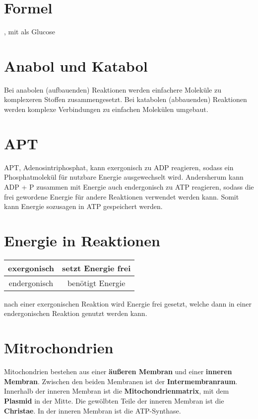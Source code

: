 \documentclass{article}
\begin{document}
 
\section{Formel} 
, mit  als Glucose
  
\section{Anabol und Katabol} 
Bei anabolen (aufbauenden) Reaktionen werden einfachere Moleküle zu komplexeren Stoffen zusammengesetzt. Bei katabolen (abbauenden) Reaktionen werden komplexe Verbindungen zu einfachen Molekülen umgebaut.
 
\section{APT}
APT, Adenosintriphosphat, kann exergonisch zu ADP reagieren, sodass ein Phosphatmolekül für nutzbare Energie ausgewechselt wird. Andersherum kann ADP + P zusammen mit Energie auch endergonisch zu ATP reagieren, sodass die frei gewordene Energie für andere Reaktionen verwendet werden kann. Somit kann Energie sozusagen in ATP gespeichert werden.
 
\section{Energie in Reaktionen}
 
\begin{center}
\begin{tabular}{ |c|c| }
\hline
 exergonisch & setzt Energie frei \\
\hline
 endergonisch & benötigt Energie \\
\hline
\end{tabular}
\end{center}
nach einer exergonischen Reaktion wird Energie frei gesetzt, welche dann in einer endergonischen Reaktion genutzt werden kann.
 
\section{Mitrochondrien} 
Mitochondrien bestehen aus einer \textbf{äußeren Membran} und einer \textbf{inneren Membran}. Zwischen den beiden Membranen ist der \textbf{Intermembranraum}. Innerhalb der inneren Membran ist die \textbf{Mitochondrienmatrix}, mit dem \textbf{Plasmid} in der Mitte. Die gewölbten Teile der inneren Membran ist die \textbf{Christae}.
In der inneren Membran ist die ATP-Synthase.
 
\end{document}
